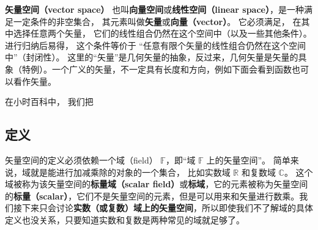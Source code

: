 

\textbf{矢量空间（vector space）} 也叫\textbf{向量空间}或\textbf{线性空间（linear space）}，是一种满足一定条件的非空集合， 其元素叫做\textbf{矢量}或\textbf{向量（vector）}。 它必须满足， 在其中选择任意两个矢量， 它们的线性组合仍然在这个空间中（以及一些其他条件）。 进行归纳后易得， 这个条件等价于 “任意有限个矢量的线性组合仍然在这个空间中”（封闭性）。 这里的“矢量”是几何矢量的抽象，反过来，几何矢量是矢量的具象（特例）。一个广义的矢量，不一定具有长度和方向，例如下面会看到函数也可以看作矢量。

在小时百科中， 我们把

\subsection{定义}
矢量空间的定义必须依赖一个域（field） $\mathbb F$，即“域 $\mathbb{F}$ 上的矢量空间”。 简单来说，域就是能进行加减乘除的对象的一个集合， 比如实数域 $\mathbb R$ 和复数域 $\mathbb C$。 这个域被称为该矢量空间的\textbf{标量域（scalar field）}或\textbf{标域}，它的元素被称为矢量空间的\textbf{标量（scalar）}，它们不是矢量空间的元素，但是可以用来和矢量进行数乘。我们接下来只会讨论\textbf{实数（或复数）域上的矢量空间}，所以即使我们不了解域的具体定义也没关系，只要知道实数和复数是两种常见的域就足够了。

